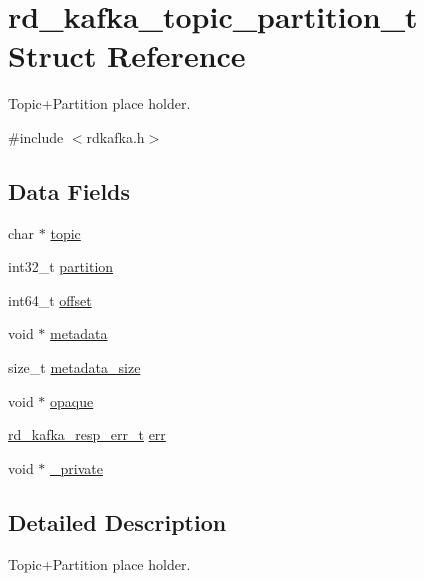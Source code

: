 \hypertarget{structrd__kafka__topic__partition__t}{\section{rd\-\_\-kafka\-\_\-topic\-\_\-partition\-\_\-t Struct Reference}
\label{structrd__kafka__topic__partition__t}
}


Topic+\-Partition place holder.  




{\ttfamily \#include $<$rdkafka.\-h$>$}

\subsection*{Data Fields}
\begin{DoxyCompactItemize}
\item 
char $\ast$ \hyperlink{structrd__kafka__topic__partition__t_a981a6411337ecf5d95e6ab48d1071177}{topic}
\item 
int32\-\_\-t \hyperlink{structrd__kafka__topic__partition__t_aa37d08c9e5f4612f5a962405c65ae2c1}{partition}
\item 
int64\-\_\-t \hyperlink{structrd__kafka__topic__partition__t_a60c27c6a2f759b7fdfd382b93c12cd3c}{offset}
\item 
void $\ast$ \hyperlink{structrd__kafka__topic__partition__t_aa2a3d40daa1b0158186f3584886da5dc}{metadata}
\item 
size\-\_\-t \hyperlink{structrd__kafka__topic__partition__t_a6f3387092692f325404bf3929247eede}{metadata\-\_\-size}
\item 
void $\ast$ \hyperlink{structrd__kafka__topic__partition__t_a8ab6583124ba3e7382be5b2148672a4c}{opaque}
\item 
\hyperlink{rdkafka_8h_a03509bab51072c72a8dcf52337e6d5cb}{rd\-\_\-kafka\-\_\-resp\-\_\-err\-\_\-t} \hyperlink{structrd__kafka__topic__partition__t_ab9370931853903657d7cabc9643d336e}{err}
\item 
void $\ast$ \hyperlink{structrd__kafka__topic__partition__t_ac41b2fea58ecc44fd8c99780ed9f6389}{\-\_\-private}
\end{DoxyCompactItemize}


\subsection{Detailed Description}
Topic+\-Partition place holder. 

